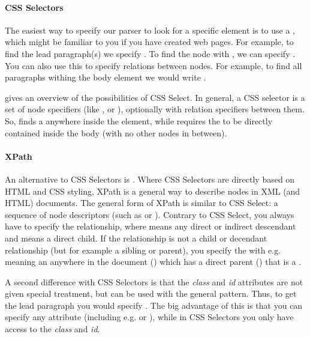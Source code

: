 

\paragraph{CSS Selectors} The easiest way to specify our parser to look for a specific element is to use a ,
which might be familiar to you if you have created web pages.
For example, to find the lead paragraph(s) we specify .
To find the node with , we can specify .
You can also use this to specify relations between nodes. For example,
to find all paragraphs withing the body element we would write .

 gives an overview of the possibilities of CSS Select.
In general, a CSS selector is a set of node specifiers (like ,  or ),
optionally with relation specifiers between them.
So,  finds a  anywhere inside the  element,
while  requires the  to be directly contained inside the body
(with no other nodes in between).

\paragraph{XPath}
An alternative to CSS Selectors is .
Where CSS Selectors are directly based on HTML and CSS styling,
XPath is a general way to describe nodes in XML (and HTML) documents.
The general form of XPath is similar to CSS Select:
a sequence of node descriptors (such as  or \ttt{*[@id='body']}).
Contrary to CSS Select, you always have to specify the relationship, where
\ttt{//} means any direct or indirect descendant and \ttt{/} means a direct child.
If the relationship is not a child or decendant relationship (but for example a sibling or parent),
you specify the  with e.g.  meaning an  anywhere in the document () which has a direct parent () that is a . 

A second difference with CSS Selectors is that the \emph{class} and \emph{id} attributes are not given special treatment,
but can be used with the general \ttt{[@attribute='value']} pattern.
Thus, to get the lead paragraph you would specify .
The big advantage of this is that you can specify any attribute (including e.g.  or ),
while in CSS Selectors you only have access to the \emph{class} and \emph{id}. 

